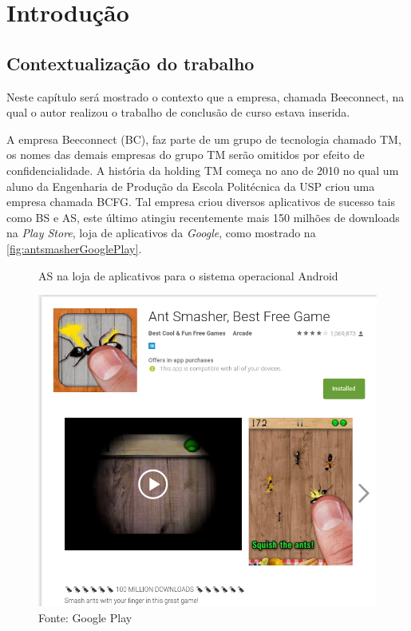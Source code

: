\chapter[Introdução]{Introdução}
\label{chap:introducao}
\section{Contextualização do trabalho}
\label{cha:contexto}

Neste capítulo será mostrado o contexto que a empresa, chamada Beeconnect, na qual o autor realizou o trabalho de conclusão de curso estava inserida.

A empresa Beeconnect (BC), faz parte de um grupo de tecnologia chamado TM, os nomes das demais empresas do grupo TM serão omitidos por efeito de confidencialidade. A história da holding TM começa no ano de 2010 no qual um aluno da Engenharia de Produção da Escola Politécnica da USP criou uma empresa chamada BCFG. Tal empresa criou diversos aplicativos de sucesso tais como BS e AS, este último atingiu recentemente mais 150 milhões de downloads na \textit{Play Store}, loja de aplicativos da \textit{Google}, como mostrado na \autoref{fig:antsmasherGooglePlay}. 

\begin{figure}[H]
\caption{AS na loja de aplicativos para o sistema operacional Android}
\centerline{\includegraphics[scale=0.5]{img/antsmasherGooglePlay}}
\label{fig:antsmasherGooglePlay}
\caption* {Fonte: Google Play}
\end{figure}


